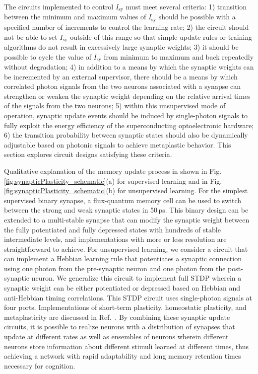 \documentclass[twocolumn]{article}
\newcommand{\onlinecite}[1]{\hspace{-1 ex} \nocite{#1}\citenum{#1}}
\begin{document}
The circuits implemented to control $I_{\mathrm{sy}}$ must meet several criteria: 1) transition between the minimum and maximum values of $I_{\mathrm{sy}}$ should be possible with a specified number of increments to control the learning rate; 2) the circuit should not be able to set $I_{\mathrm{sy}}$ outside of this range so that simple update rules or training algorithms do not result in excessively large synaptic weights; 3) it should be possible to cycle the value of $I_{\mathrm{sy}}$ from minimum to maximum and back repeatedly without degradation; 4) in addition to a means by which the synaptic weights can be incremented by an external supervisor, there should be a means by which correlated photon signals from the two neurons associated with a synapse can strengthen or weaken the synaptic weight depending on the relative arrival times of the signals from the two neurons; 5) within this unsupervised mode of operation, synaptic update events should be induced by single-photon signals to fully exploit the energy efficiency of the superconducting optoelectronic hardware; 6) the transition probability between synaptic states should also be dynamically adjustable based on photonic signals to achieve metaplastic behavior. This section explores circuit designs satisfying these criteria.

Qualitative explanation of the memory update process in shown in Fig.\,\ref{fig:synapticPlasticity_schematic}(a) for supervised learning and in Fig.\,\ref{fig:synapticPlasticity_schematic}(b) for unsupervised learning. For the simplest supervised binary synapse, a flux-quantum memory cell can be used to switch between the strong and weak synaptic states in 50\,ps. This binary design can be extended to a multi-stable synapse that can modify the synaptic weight between the fully potentiated and fully depressed states with hundreds of stable intermediate levels, and implementations with more or less resolution are straightforward to achieve. For unsupervised learning, we consider a circuit that can implement a Hebbian learning rule that potentiates a synaptic connection using one photon from the pre-synaptic neuron and one photon from the post-synaptic neuron. We generalize this circuit to implement full STDP wherein a synaptic weight can be either potentiated or depressed based on Hebbian and anti-Hebbian timing correlations. This STDP circuit uses single-photon signals at four ports. Implementations of short-term plasticity, homeostatic plasticity, and metaplasticity are discussed in Ref.\,\onlinecite{sh2018c}. By combining these synaptic update circuits, it is possible to realize neurons with a distribution of synapses that update at different rates as well as ensembles of neurons wherein different neurons store information about different stimuli learned at different times, thus achieving a network with rapid adaptability and long memory retention times necessary for cognition. 
	
\end{document}

